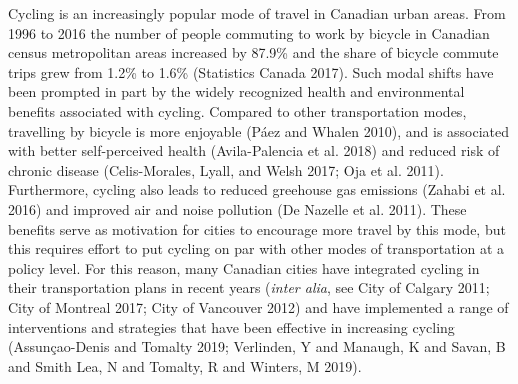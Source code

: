 \documentclass[smallextended]{svjour3}       %
\begin{document}
Cycling is an increasingly popular mode of travel in Canadian urban
areas. From 1996 to 2016 the number of people commuting to work by
bicycle in Canadian census metropolitan areas increased by 87.9\% and
the share of bicycle commute trips grew from 1.2\% to 1.6\% (Statistics
Canada 2017). Such modal shifts have been prompted in part by the widely
recognized health and environmental benefits associated with cycling.
Compared to other transportation modes, travelling by bicycle is more
enjoyable (Páez and Whalen 2010), and is associated with better
self-perceived health (Avila-Palencia et al. 2018) and reduced risk of
chronic disease (Celis-Morales, Lyall, and Welsh 2017; Oja et al. 2011).
Furthermore, cycling also leads to reduced greehouse gas emissions
(Zahabi et al. 2016) and improved air and noise pollution (De Nazelle et
al. 2011). These benefits serve as motivation for cities to encourage
more travel by this mode, but this requires effort to put cycling on par
with other modes of transportation at a policy level. For this reason,
many Canadian cities have integrated cycling in their transportation
plans in recent years (\emph{inter alia}, see City of Calgary 2011; City
of Montreal 2017; City of Vancouver 2012) and have implemented a range
of interventions and strategies that have been effective in increasing
cycling (Assunçao-Denis and Tomalty 2019; Verlinden, Y and Manaugh, K
and Savan, B and Smith Lea, N and Tomalty, R and Winters, M 2019).
\end{document}
